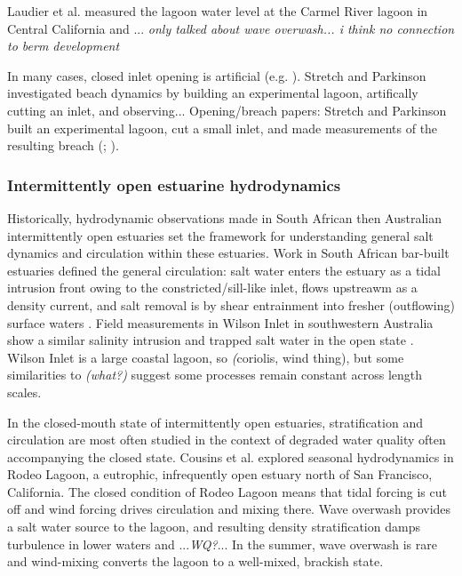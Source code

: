 Laudier et al. \parencite*{laudier_measured_2011} measured the lagoon water level at the Carmel River lagoon in Central California and ... \emph{only talked about wave overwash... i think no connection to berm development}


In many cases, closed inlet opening is artificial (e.g. \cite{fortunato_morphological_2014, behrens_episodic_2013}). Stretch and Parkinson investigated beach dynamics by building an experimental lagoon, artifically cutting an inlet, and observing...
Opening/breach papers: \parencite{rich_hydrologic_2013, parkinson_breaching_2007, stretch_breaching_2006, elwany_opening_1998, fortunato_morphological_2014}
Stretch and Parkinson built an experimental lagoon, cut a small inlet, and made measurements of the resulting breach (\cite*{stretch_breaching_2006}; \cite{parkinson_breaching_2007}).



\subsubsection{Intermittently open estuarine hydrodynamics}

Historically, hydrodynamic observations made in South African then Australian intermittently open estuaries set the framework for understanding general salt dynamics and circulation within these estuaries. Work in South African bar-built estuaries defined the general circulation: salt water enters the estuary as a tidal intrusion front owing to the constricted/sill-like inlet, flows upstreawm as a density current, and salt removal is by shear entrainment into fresher (outflowing) surface waters \parencite{largier_stratified_1992}. Field measurements in Wilson Inlet in southwestern Australia show a similar salinity intrusion and trapped salt water in the open state \parencite{ranasinghe_circulation_1999}. Wilson Inlet is a large coastal lagoon, so \emph(coriolis, wind thing), but some similarities to \emph{(what?)} suggest some processes remain constant across length scales. 

In the closed-mouth state of intermittently open estuaries, stratification and circulation are most often studied in the context of degraded water quality often accompanying the closed state. Cousins et al. \parencite*{cousins_effects_2010} explored seasonal hydrodynamics in Rodeo Lagoon, a eutrophic, infrequently open estuary north of San Francisco, California. The closed condition of Rodeo Lagoon means that tidal forcing is cut off and wind forcing drives circulation and mixing there. Wave overwash provides a salt water source to the lagoon, and resulting density stratification damps turbulence in lower waters and ...\emph{WQ?}... In the summer, wave overwash is rare and wind-mixing converts the lagoon to a well-mixed, brackish state.

